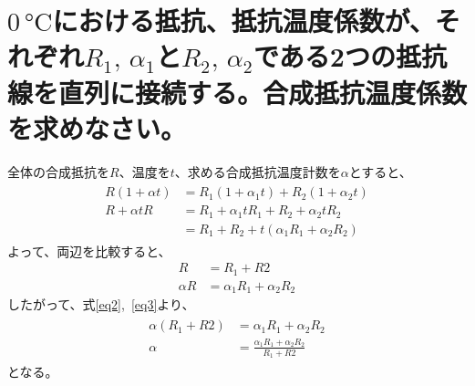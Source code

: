 \documentclass[a4paper,11pt]{jsarticle}
\begin{document}
\title{}
\author{}
\date{\today}


\section{$0\mathrm{\,\si{\celsius}}$における抵抗、抵抗温度係数が、それぞれ$R_{1},\, \alpha _1$と$R_{2},\, \alpha _{2}$である2つの抵抗線を直列に接続する。合成抵抗温度係数を求めなさい。}

全体の合成抵抗を$R$、温度を$t$、求める合成抵抗温度計数を$\alpha $とすると、
\begin{align}
  \begin{split}
    R(1+\alpha t)&=R_{1}(1+\alpha _{1}t)+R_{2}(1+\alpha _{2}t)\\
    R+\alpha tR&=R_{1}+\alpha _{1}tR_{1}+R_{2}+\alpha _{2}tR_{2}\\
    &=R_{1}+R_{2}+t(\alpha _{1}R_{1}+\alpha _{2}R_{2})\label{eq1}
  \end{split}
\end{align}
よって、両辺を比較すると、
\begin{align}
  R&=R_{1}+R{2}\label{eq2}\\
  \alpha R&=\alpha _{1}R_{1}+\alpha _{2}R_{2}\label{eq3}
\end{align}
したがって、式\eqref{eq2},~\eqref{eq3}より、
\begin{align}
  \begin{split}
    \alpha (R_{1}+R{2})
    &=\alpha _{1}R_{1}+\alpha _{2}R_{2}\\
    \alpha
    &=\frac{\alpha _{1}R_{1}+\alpha _{2}R_{2}}{R_{1}+R{2}}
    \label{eq4}
  \end{split}
\end{align}
となる。
\end{document}
